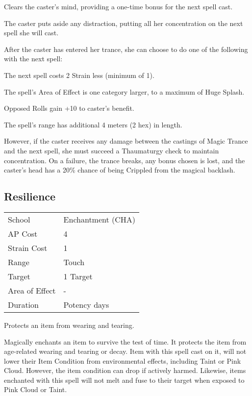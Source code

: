 \documentclass[11pt,a4paper,twocolumn]{book}
\begin{document}
\medskip

Clears the caster's mind, providing a one-time bonus for the next spell cast.

The caster puts aside any distraction, putting all her concentration on the next spell she will cast.

After the caster has entered her trance, she can choose to do one of the following with the next spell:
\medskip
\begin{compactitem}
	\item The next spell costs 2 Strain less (minimum of 1).
	\item The spell's Area of Effect is one category larger, to a maximum of Huge Splash.
	\item Opposed Rolls gain +10 to caster's benefit.
	\item The spell's range has additional 4 meters (2 hex) in length.
\end{compactitem}
\medskip

However, if the caster receives any damage between the castings of Magic Trance and the next spell, she must succeed a Thaumaturgy check to maintain concentration. On a failure, the trance breaks, any bonus chosen is lost, and the caster's head has a 20\% chance of being Crippled from the magical backlash.


\subsection*{Resilience}
{
	\begin{tabu} to 75mm{| X[l,4] | X[l,7] |}
		\hline
		School 			& Enchantment (CHA) 	\\
		AP Cost	      	& 4 					\\
		Strain Cost     & 1 					\\
		Range     		& Touch					\\
		Target      	& 1 Target				\\
		Area of Effect  & -  	 				\\
		Duration     	& Potency days			\\ \hline
	\end{tabu}
	
}

\medskip

Protects an item from wearing and tearing.

Magically enchants an item to survive the test of time. It protects the item from age-related wearing and tearing or decay. Item with this spell cast on it, will not lower their Item Condition from environmental effects, including Taint or Pink Cloud.  However, the item condition can drop if actively harmed. Likewise, items enchanted with this spell will not melt and fuse to their target when exposed to Pink Cloud or Taint.
\end{document}
